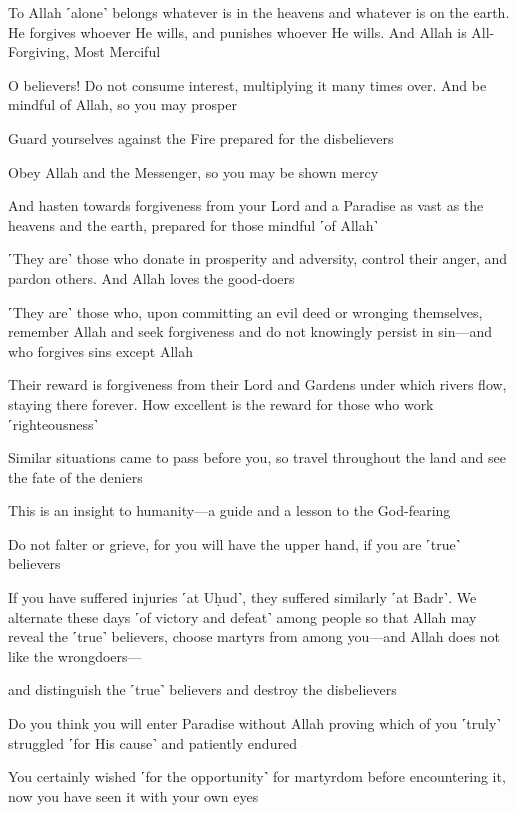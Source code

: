 To Allah ˹alone˺ belongs whatever is in the heavens and whatever is on the earth. He forgives whoever He wills, and punishes whoever He wills. And Allah is All-Forgiving, Most Merciful

O believers! Do not consume interest, multiplying it many times over. And be mindful of Allah, so you may prosper

Guard yourselves against the Fire prepared for the disbelievers

Obey Allah and the Messenger, so you may be shown mercy

And hasten towards forgiveness from your Lord and a Paradise as vast as the heavens and the earth, prepared for those mindful ˹of Allah˺

˹They are˺ those who donate in prosperity and adversity, control their anger, and pardon others. And Allah loves the good-doers

˹They are˺ those who, upon committing an evil deed or wronging themselves, remember Allah and seek forgiveness and do not knowingly persist in sin—and who forgives sins except Allah

Their reward is forgiveness from their Lord and Gardens under which rivers flow, staying there forever. How excellent is the reward for those who work ˹righteousness˺

Similar situations came to pass before you, so travel throughout the land and see the fate of the deniers

This is an insight to humanity—a guide and a lesson to the God-fearing

Do not falter or grieve, for you will have the upper hand, if you are ˹true˺ believers

If you have suffered injuries ˹at Uḥud˺, they suffered similarly ˹at Badr˺. We alternate these days ˹of victory and defeat˺ among people so that Allah may reveal the ˹true˺ believers, choose martyrs from among you—and Allah does not like the wrongdoers—

and distinguish the ˹true˺ believers and destroy the disbelievers

Do you think you will enter Paradise without Allah proving which of you ˹truly˺ struggled ˹for His cause˺ and patiently endured

You certainly wished ˹for the opportunity˺ for martyrdom before encountering it, now you have seen it with your own eyes

